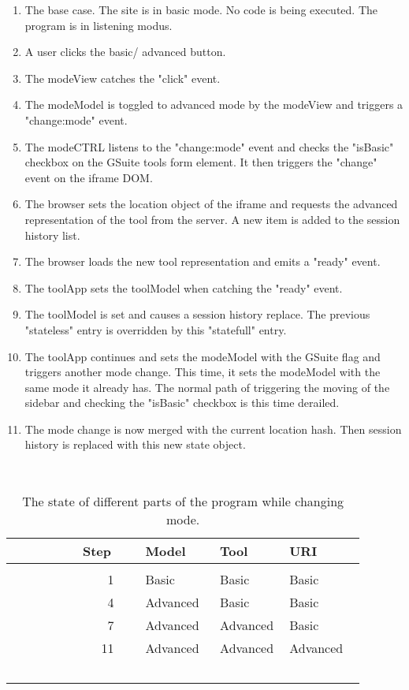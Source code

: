 \documentclass[english]{ifimaster}
\begin{document}
\begin{enumerate}
\item The base case. The site is in basic mode. No code is being executed. The program is in listening modus.
\item A user clicks the basic/ advanced button.
\item The modeView catches the "click" event.
\item The modeModel is toggled to advanced mode by the modeView and triggers a "change:mode" event.
\item The modeCTRL listens to the "change:mode" event and checks the "isBasic" checkbox on the GSuite tools form element. It then triggers the "change" event on the iframe DOM.
\item The browser sets the location object of the iframe and requests the advanced representation of the tool from the server. A new item is added to the session history list.
\item The browser loads the new tool representation and emits a "ready" event.
\item The toolApp sets the toolModel when catching the "ready" event.
\item The toolModel is set and causes a session history replace. The previous "stateless" entry is overridden by this "statefull" entry.
\item The toolApp continues and sets the modeModel with the GSuite flag and triggers another mode change. This time, it sets the modeModel with the same mode it already has. The normal path of triggering the moving of the sidebar and checking the "isBasic" checkbox is this time derailed.
\item The mode change is now merged with the current location hash. Then session history is replaced with this new state object. 
\end{enumerate}
 
\begin{table}
\centering
    \begin{tabular}{rlll}
    
     Step    & Model    & Tool     & URI      \\ [0.5ex]\hline\\ [0.1ex]
        1    & Basic    & Basic    & Basic    \\ 
        4    & Advanced & Basic    & Basic    \\ 
        7    & Advanced & Advanced & Basic    \\ 
        11    & Advanced & Advanced & Advanced \\[1ex] 

    \end{tabular}
    \caption{The state of different parts of the program while changing mode.}
\label{table:1}
\end{table}
\end{document}
